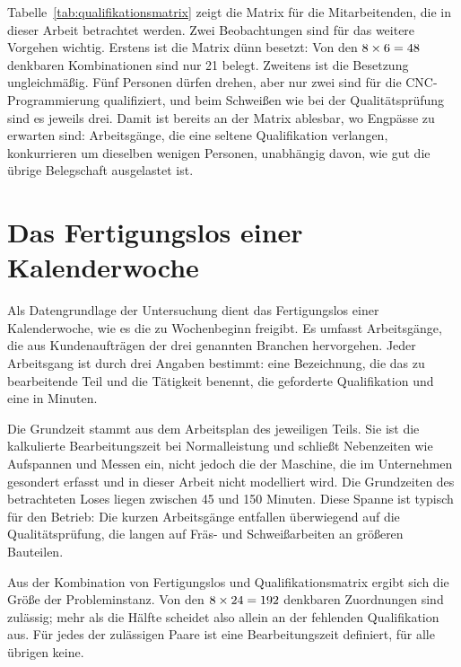 Tabelle~\ref{tab:qualifikationsmatrix} zeigt die Matrix für die
\ZahlMitarbeiter{} Mitarbeitenden, die in dieser Arbeit betrachtet werden. Zwei
Beobachtungen sind für das weitere Vorgehen wichtig. Erstens ist die Matrix
dünn besetzt: Von den $8 \times 6 = 48$
denkbaren Kombinationen sind nur 21 belegt. Zweitens ist die Besetzung
ungleichmäßig. Fünf Personen dürfen drehen, aber nur zwei sind für die
CNC-Programmierung qualifiziert, und beim Schweißen wie bei der
Qualitätsprüfung sind es jeweils drei. Damit ist bereits an der Matrix
ablesbar, wo Engpässe zu erwarten sind: Arbeitsgänge, die eine seltene
Qualifikation verlangen, konkurrieren um dieselben wenigen Personen,
unabhängig davon, wie gut die übrige Belegschaft ausgelastet ist.

\section{Das Fertigungslos einer Kalenderwoche}
\label{sec:fertigungslos}

Als Datengrundlage der Untersuchung dient das Fertigungslos einer
Kalenderwoche, wie es die  zu Wochenbeginn freigibt.
Es umfasst \ZahlAufgaben{} Arbeitsgänge, die aus Kundenaufträgen der drei
genannten Branchen hervorgehen. Jeder Arbeitsgang ist durch drei Angaben
bestimmt: eine Bezeichnung, die das zu bearbeitende Teil und die Tätigkeit
benennt, die geforderte Qualifikation und eine  in Minuten.

Die Grundzeit stammt aus dem Arbeitsplan des jeweiligen Teils. Sie ist die
kalkulierte Bearbeitungszeit bei Normalleistung und schließt Nebenzeiten wie
Aufspannen und Messen ein, nicht jedoch die  der Maschine, die im
Unternehmen gesondert erfasst und in dieser Arbeit nicht modelliert wird. Die
Grundzeiten des betrachteten Loses liegen zwischen 45 und 150 Minuten. Diese
Spanne ist typisch für den Betrieb: Die kurzen Arbeitsgänge entfallen
überwiegend auf die Qualitätsprüfung, die langen auf Fräs- und Schweißarbeiten
an größeren Bauteilen.

Aus der Kombination von Fertigungslos und Qualifikationsmatrix ergibt sich die
Größe der Probleminstanz. Von den $8 \times 24 = 192$
denkbaren Zuordnungen sind \ZahlPaare{} zulässig; mehr als die Hälfte scheidet
also allein an der fehlenden Qualifikation aus. Für jedes der \ZahlPaare{}
zulässigen Paare ist eine Bearbeitungszeit definiert, für alle übrigen keine.


